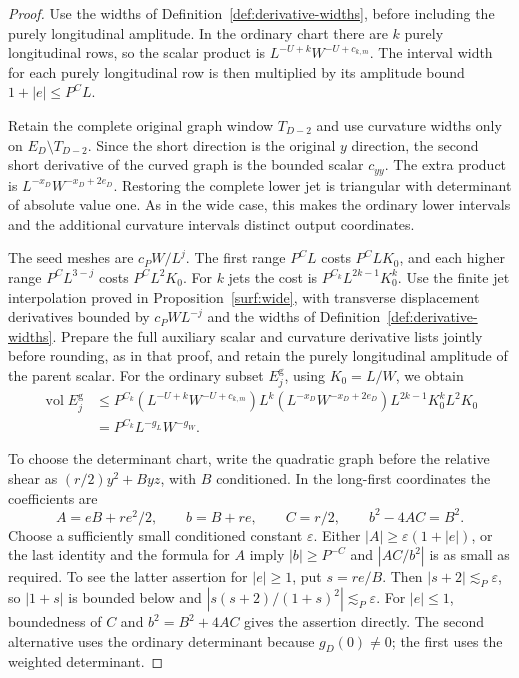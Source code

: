 \documentclass[11pt]{amsart}
\theoremstyle{definition}
\theoremstyle{remark}
\numberwithin{equation}{section}
\begin{document}
\begin{proof}
Use the widths of Definition~\ref{def:derivative-widths}, before including the purely longitudinal amplitude. In the ordinary chart there are $k$ purely longitudinal rows, so the scalar product is $L^{-U+k}W^{-U+c_{k,m}}$. The interval width for each purely longitudinal row is then multiplied by its amplitude bound $1+|e|\le P^CL$.

Retain the complete original graph window $T_{D-2}$ and use curvature widths only on $E_D\setminus T_{D-2}$. Since the short direction is the original $y$ direction, the second short derivative of the curved graph is the bounded scalar $c_{yy}$. The extra product is $L^{-x_D}W^{-x_D+2e_D}$. Restoring the complete lower jet is triangular with determinant of absolute value one. As in the wide case, this makes the ordinary lower intervals and the additional curvature intervals distinct output coordinates.

The seed meshes are $c_PW/L^j$. The first range $P^CL$ costs $P^CLK_0$, and each higher range $P^CL^{3-j}$ costs $P^CL^2K_0$. For $k$ jets the cost is $P^{C_k}L^{2k-1}K_0^k$. Use the finite jet interpolation proved in Proposition~\ref{surf:wide}, with transverse displacement derivatives bounded by $c_PWL^{-j}$ and the widths of Definition~\ref{def:derivative-widths}. Prepare the full auxiliary scalar and curvature derivative lists jointly before rounding, as in that proof, and retain the purely longitudinal amplitude of the parent scalar. For the ordinary subset $E_j^{\mathrm g}$, using $K_0=L/W$, we obtain
\[
\begin{aligned}
\operatorname{vol}E_j^{\mathrm g}&\le P^{C_k}(L^{-U+k}W^{-U+c_{k,m}})L^k(L^{-x_D}W^{-x_D+2e_D})L^{2k-1}K_0^kL^2K_0\\
&=P^{C_k}L^{-g_L}W^{-g_W}.
\end{aligned}
\]

To choose the determinant chart, write the quadratic graph before the relative shear as $(r/2)y^2+Byz$, with $B$ conditioned. In the long-first coordinates the coefficients are
\[
A=eB+re^2/2,\qquad b=B+re,\qquad C=r/2,\qquad b^2-4AC=B^2.
\]
Choose a sufficiently small conditioned constant $\varepsilon$. Either $|A|\ge\varepsilon(1+|e|)$, or the last identity and the formula for $A$ imply $|b|\ge P^{-C}$ and $|AC/b^2|$ is as small as required. To see the latter assertion for $|e|\ge1$, put $s=re/B$. Then $|s+2|\lesssim_P\varepsilon$, so $|1+s|$ is bounded below and $|s(s+2)/(1+s)^2|\lesssim_P\varepsilon$. For $|e|\le1$, boundedness of $C$ and $b^2=B^2+4AC$ gives the assertion directly. The second alternative uses the ordinary determinant because $g_D(0)\ne0$; the first uses the weighted determinant.


\end{proof}
\end{document}
